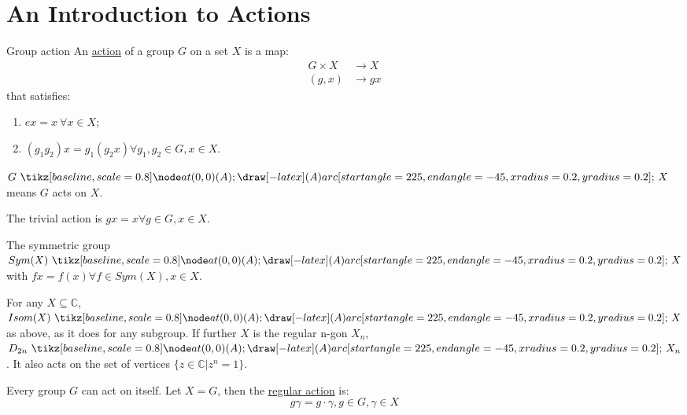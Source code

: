 \documentclass[../Main.tex]{subfiles}
\begin{document}
\section{An Introduction to Actions}
\begin{definition}{Group action}
    An \underline{action} of a group $G$ on a set $X$ is a map:
    \begin{align*}
        G \times X &\rightarrow X \\
        (g, x) &\rightarrow gx
    \end{align*}
    that satisfies:
    \begin{enumerate}
        \item $ex = x~\forall x \in X$;\label{actAxiomIdentity}
        \item $(g_1 g_2)x = g_1(g_2 x) \forall g_1, g_2 \in G, x \in X$.\label{actAxiomAssoc}
    \end{enumerate}
\end{definition}
$G \actson X$ means $G$ acts on $X$.\par
The trivial action is $gx=x \forall g \in G, x \in X$.\par
The symmetric group $Sym(X) \actson X$ with $fx=f(x) \forall f \in Sym(X), x \in X$.\par
For any $X \subseteq \mathbb{C}$, $Isom(X) \actson X$ as above, as it does for any subgroup. If further $X$ is the regular n-gon $X_n$, $D_{2n} \actson X_n$. It also acts on the set of vertices $\{z \in \mathbb{C} | z^n = 1\}$.\par
Every group $G$ can act on itself. Let $X = G$, then the \underline{regular action} is:
\begin{equation*}
    g \gamma = g \cdot \gamma, g \in G, \gamma \in X
\end{equation*}
\end{document}
